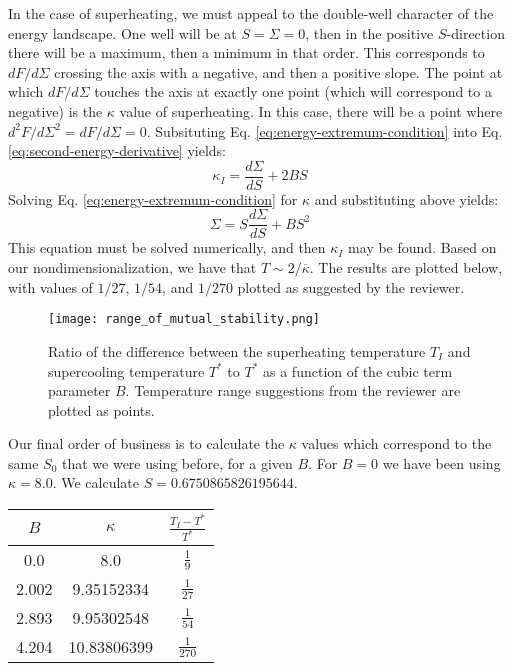 \documentclass[reqno]{article}
\begin{document}
    In the case of superheating, we must appeal to the double-well character of the energy landscape.
    One well will be at $S = \Sigma = 0$, then in the positive $S$-direction there will be a maximum, then a minimum in that order.
    This corresponds to $dF/d\Sigma$ crossing the axis with a negative, and then a positive slope.
    The point at which $dF/d\Sigma$ touches the axis at exactly one point (which will correspond to a negative) is the $\kappa$ value of superheating.
    In this case, there will be a point where $d^2 F/d\Sigma^2 = dF/d\Sigma = 0$.
    Subsituting Eq. \eqref{eq:energy-extremum-condition} into Eq. \eqref{eq:second-energy-derivative} yields:
    \begin{equation}
        \kappa_I
        =
        \frac{d\Sigma}{dS}
        + 2 B S
    \end{equation}
    Solving Eq. \eqref{eq:energy-extremum-condition} for $\kappa$ and substituting above yields:
    \begin{equation}
        \Sigma
        =
        S \frac{d\Sigma}{dS}
        + B S^2
    \end{equation}
    This equation must be solved numerically, and then $\kappa_I$ may be found.
    Based on our nondimensionalization, we have that $T \sim 2 / \overline{\kappa}$.
    The results are plotted below, with values of $1/27$, $1/54$, and $1/270$ plotted as suggested by the reviewer.
    \begin{figure}[H]
        \centering
        \texttt{[image: range\_of\_mutual\_stability.png]}
        \caption{Ratio of the difference between the superheating temperature $T_I$ and supercooling temperature $T^*$ to $T^*$ as a function of the cubic term parameter $B$.
        Temperature range suggestions from the reviewer are plotted as points.}
    \end{figure}

    Our final order of business is to calculate the $\kappa$ values which correspond to the same $S_0$ that we were using before, for a given $B$.
    For $B = 0$ we have been using $\kappa = 8.0$.
    We calculate $S = 0.6750865826195644$.
    \begin{center}
        \begin{tabular}{|c | c | c|} 
            \hline
            $B$ & $\kappa$ & $\frac{T_I - T^*}{T^*}$\\ [1ex] 
            \hline
            0.0 & 8.0 & $\frac{1}{9}$ \\ [1ex]
            \hline
            2.002 & 9.35152334 & $\frac{1}{27}$ \\ [1ex]
            \hline
            2.893 & 9.95302548 & $\frac{1}{54}$ \\ [1ex]
            \hline
            4.204 & 10.83806399 & $\frac{1}{270}$ \\ [1ex]
            \hline
        \end{tabular}
    \end{center}
\end{document}
